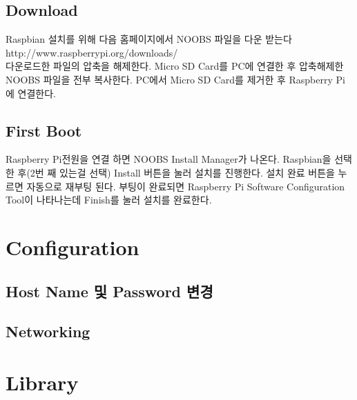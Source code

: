 \documentclass[11pt
  , a4paper
  , article
  , oneside
]{memoir}
\begin{document}
\subsection{Download}
Raspbian 설치를 위해 다음 홈페이지에서 NOOBS 파일을 다운 받는다\\
http://www.raspberrypi.org/downloads/\\
다운로드한 파일의 압축을 해제한다. Micro SD Card를 PC에 연결한 후 압축해제한\\ 
NOOBS 파일을 전부 복사한다.
PC에서 Micro SD Card를 제거한 후 Raspberry Pi에 연결한다.
\subsection{First Boot}
Raspberry Pi전원을 연결 하면 NOOBS Install Manager가 나온다.
Raspbian을 선택한 후(2번 째 있는걸 선택) Install 버튼을 눌러 설치를 진행한다.
설치 완료 버튼을 누르면 자동으로 재부팅 된다.
부팅이 완료되면 Raspberry Pi Software Configuration Tool이 나타나는데 Finish를 눌러 설치를 완료한다.
\section{Configuration}
\subsection{Host Name 및 Password 변경}

\subsection{Networking}

\section{Library}
\end{document}
